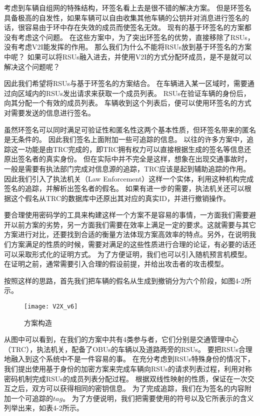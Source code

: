 考虑到车辆自组网的特殊结构，环签名看上去是很不错的解决方案。
但是环签名具备极高的自发性，如果车辆可以自由收集其他车辆的公钥并对消息进行签名的话，很容易由于环中存在失效的成员而使签名无效。
现有的基于环签名的方案\cite{xiong2010efficient,chaurasia2011conditional,zeng2015privacy}都没有考虑这个问题。
在这些方案中，为了突出环签名的优势，直接移除了RSUs，没有考虑V2I能发挥的作用。
那么我们为什么不能将RSUs放到基于环签名的方案中呢？
如果可以将RSUs融入进去，并使用V2I的方式分配环成员，是不是就可以解决这个问题呢？

因此我们希望将RSUs与基于环签名的方案结合。
在车辆进入某一区域时，需要通过向区域内的RSUs发出请求来获取一个成员列表。
RSUs在验证车辆的身份后，向其分配一个有效的成员列表。
车辆收到这个列表后，便可以使用环签名的方式对需要发送的信息进行签名。

虽然环签名可以同时满足可验证性和匿名性这两个基本性质，但环签名带来的匿名是无条件的。
因此我们签名上面附加一些可追踪的信息。
以往的许多方案中，追踪这一功能是由TRC完成的，即TRC拥有权力可以直接根据生成的签名等信息还原出签名者的真实身份。
但在实际中并不完全是这样，想象在出现交通事故时，一般是需要有执法部门完成对信息源的追踪，TRC应该是起到辅助追踪的作用。
因此我们引入了执法机关（Law Enforcement）这样一个实体，利用这种机构完成签名的追踪，并解析出签名者的假名。
如果有进一步的需要，执法机关还可以根据这个假名从TRC的数据库中还原出其对应的真实ID，并进行撤销操作。

要合理使用密码学的工具来构建这样一个方案不是容易的事情，一方面我们需要避开以前方案的劣势，另一方面我们需要在效率上满足一定的要求。这就需要与其它方案进行对比，还要找到合适的衡量方法体现方案高效率的特点。另外，在说明我们方案满足的性质的时候，需要对满足的这些性质进行合理的论证，有必要的话还可以采取形式化的证明方式。
为了方便证明，我们也可以引入随机预言机模型。
在证明之前，通常需要引入合理的假设前提，并给出攻击者的攻击模型。

按照这样的思路，首先我们把车辆的假名从生成到撤销分为六个阶段，如图4-2所示。

\begin{figure}[h]
\centering
\texttt{[image: V2X\_v6]}
\caption{方案构造}
\end{figure}

从图中可以看到，在我们的方案中共有4类参与者，它们分别是交通管理中心（TRC），执法机关，配备了OBUs的车辆以及道路两旁的RSUs。
要把RSUs合理地融入到这个系统中不是一件容易的事。
在充分考虑到RSUs特殊身份的情况下，我们提出使用基于身份的加密方案来完成车辆向RSUs的请求列表过程，利用对称密码机制完成RSUs的成员列表分配过程。
根据双线性映射的性质，保证在一次交互之后，双方可以获得相同的密钥信息。
为了完成追踪，我们在为签名的内容附加一个可追踪的$tag$。
为了方便说明，我们把需要使用的符号以及它所表示的含义列举出来，如表4-2所示。


